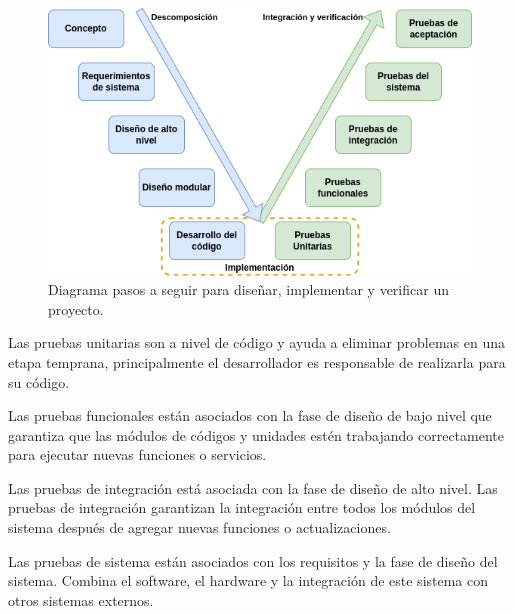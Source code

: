 \vspace{1cm}
\begin{figure}[htbp]
    \centering
    \includegraphics[width=\linewidth]{./Figures/verif.png}
    \caption{Diagrama pasos a seguir para diseñar, implementar y verificar un proyecto.}\label{fig:sdi}
\end{figure}
\vspace{1cm}


Las pruebas unitarias son a nivel de código y ayuda a eliminar
problemas en una etapa temprana, principalmente el desarrollador es responsable
de realizarla para su código.

Las pruebas funcionales están asociados con la fase de diseño de bajo nivel
que garantiza que las módulos de códigos y unidades estén trabajando correctamente
para ejecutar nuevas funciones o servicios.

Las pruebas de integración está asociada con la fase de diseño de alto
nivel. Las pruebas de integración garantizan la integración entre todos
los módulos del sistema después de agregar nuevas funciones o actualizaciones.

Las pruebas de sistema están asociados con los requisitos y la fase de
diseño del sistema. Combina el software, el hardware y la integración de este
sistema con otros sistemas externos.

